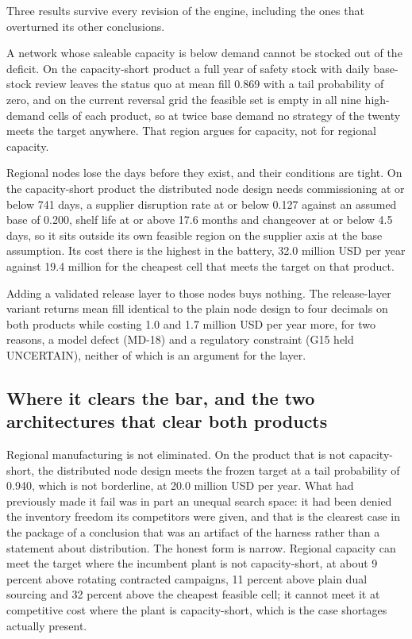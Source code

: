 Three results survive every revision of the engine, including the ones that overturned its other
conclusions.

A network whose saleable capacity is below demand cannot be stocked out of the deficit. On the
capacity-short product a full year of safety stock with daily base-stock review leaves the status quo
at mean fill 0.869 with a tail probability of zero, and on the current reversal grid the feasible set
is empty in all nine high-demand cells of each product, so at twice base demand no strategy of the
twenty meets the target anywhere. That region argues for capacity, not for regional capacity.

Regional nodes lose the days before they exist, and their conditions are tight. On the
capacity-short product the distributed node design needs commissioning at or below 741 days, a
supplier disruption rate at or below 0.127 against an assumed base of 0.200, shelf life at or above
17.6 months and changeover at or below 4.5 days, so it sits outside its own feasible region on the
supplier axis at the base assumption. Its cost there is the highest in the battery, 32.0 million USD
per year against 19.4 million for the cheapest cell that meets the target on that product.

Adding a validated release layer to those nodes buys nothing. The release-layer variant returns mean
fill identical to the plain node design to four decimals on both products while costing 1.0 and 1.7
million USD per year more, for two reasons, a model defect (MD-18) and a regulatory constraint (G15
held UNCERTAIN), neither of which is an argument for the layer.

\subsection{Where it clears the bar, and the two architectures that clear both products}

Regional manufacturing is not eliminated. On the product that is not capacity-short, the distributed
node design meets the frozen target at a tail probability of 0.940, which is not borderline, at 20.0
million USD per year. What had previously made it fail was in part an unequal search space: it had
been denied the inventory freedom its competitors were given, and that is the clearest case in the
package of a conclusion that was an artifact of the harness rather than a statement about
distribution. The honest form is narrow. Regional capacity can meet the target where the incumbent
plant is not capacity-short, at about 9 percent above rotating contracted campaigns, 11 percent above
plain dual sourcing and 32 percent above the cheapest feasible cell; it cannot meet it at competitive
cost where the plant is capacity-short, which is the case shortages actually present.

